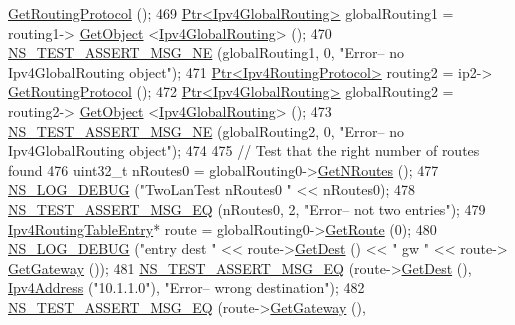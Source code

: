 \begin{DoxyCode}
      \hyperlink{classns3_1_1Ipv4L3Protocol_aa1e4efbf4978299e47406895c3f4b41d}{GetRoutingProtocol} ();
469   \hyperlink{classns3_1_1Ptr}{Ptr<Ipv4GlobalRouting>} globalRouting1 = routing1->
      \hyperlink{classns3_1_1Object_a13e18c00017096c8381eb651d5bd0783}{GetObject} <\hyperlink{classns3_1_1Ipv4GlobalRouting}{Ipv4GlobalRouting}> ();
470   \hyperlink{group__testing_ga73d66fb0050a5111453fd144e767b91a}{NS\_TEST\_ASSERT\_MSG\_NE} (globalRouting1, 0, \textcolor{stringliteral}{"Error-- no Ipv4GlobalRouting object"});  
471   \hyperlink{classns3_1_1Ptr}{Ptr<Ipv4RoutingProtocol>} routing2 = ip2->
      \hyperlink{classns3_1_1Ipv4L3Protocol_aa1e4efbf4978299e47406895c3f4b41d}{GetRoutingProtocol} ();
472   \hyperlink{classns3_1_1Ptr}{Ptr<Ipv4GlobalRouting>} globalRouting2 = routing2->
      \hyperlink{classns3_1_1Object_a13e18c00017096c8381eb651d5bd0783}{GetObject} <\hyperlink{classns3_1_1Ipv4GlobalRouting}{Ipv4GlobalRouting}> ();
473   \hyperlink{group__testing_ga73d66fb0050a5111453fd144e767b91a}{NS\_TEST\_ASSERT\_MSG\_NE} (globalRouting2, 0, \textcolor{stringliteral}{"Error-- no Ipv4GlobalRouting object"});  
474 
475   \textcolor{comment}{// Test that the right number of routes found}
476   uint32\_t nRoutes0 = globalRouting0->\hyperlink{classns3_1_1Ipv4GlobalRouting_abb9d2b3642272b9bd2697a5699922fa7}{GetNRoutes} ();
477   \hyperlink{group__logging_ga413f1886406d49f59a6a0a89b77b4d0a}{NS\_LOG\_DEBUG} (\textcolor{stringliteral}{"TwoLanTest nRoutes0 "} << nRoutes0);
478   \hyperlink{group__testing_ga2a9d78cffb3db8e867c35fff0b698cf5}{NS\_TEST\_ASSERT\_MSG\_EQ} (nRoutes0, 2, \textcolor{stringliteral}{"Error-- not two entries"});
479   \hyperlink{classns3_1_1Ipv4RoutingTableEntry}{Ipv4RoutingTableEntry}* route = globalRouting0->\hyperlink{classns3_1_1Ipv4GlobalRouting_accd518b9888908dbea189c1d1c73dcf1}{GetRoute} (0);
480   \hyperlink{group__logging_ga413f1886406d49f59a6a0a89b77b4d0a}{NS\_LOG\_DEBUG} (\textcolor{stringliteral}{"entry dest "} << route->\hyperlink{classns3_1_1Ipv4RoutingTableEntry_adcd2084c5f0261c43c059c2b981e91fa}{GetDest} () << \textcolor{stringliteral}{" gw "} << route->
      \hyperlink{classns3_1_1Ipv4RoutingTableEntry_a49dda51e0ba3c78bc969a9378bd15893}{GetGateway} ());
481   \hyperlink{group__testing_ga2a9d78cffb3db8e867c35fff0b698cf5}{NS\_TEST\_ASSERT\_MSG\_EQ} (route->\hyperlink{classns3_1_1Ipv4RoutingTableEntry_adcd2084c5f0261c43c059c2b981e91fa}{GetDest} (), 
      \hyperlink{classns3_1_1Ipv4Address}{Ipv4Address} (\textcolor{stringliteral}{"10.1.1.0"}), \textcolor{stringliteral}{"Error-- wrong destination"});
482   \hyperlink{group__testing_ga2a9d78cffb3db8e867c35fff0b698cf5}{NS\_TEST\_ASSERT\_MSG\_EQ} (route->\hyperlink{classns3_1_1Ipv4RoutingTableEntry_a49dda51e0ba3c78bc969a9378bd15893}{GetGateway} (), 

\end{DoxyCode}
